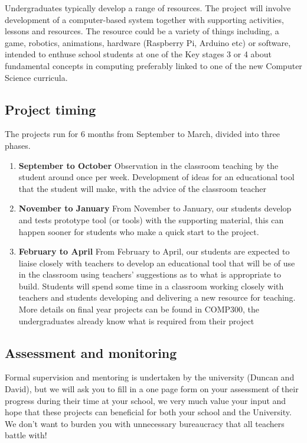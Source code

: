 \documentclass[12pt,]{book}
\providecommand{\tightlist}{%
  \setlength{\itemsep}{0pt}\setlength{\parskip}{0pt}}
\begin{document}
Undergraduates typically develop a range of resources. The project will involve development of a computer-based system together with supporting activities, lessons and resources. The resource could be a variety of things including, a game, robotics, animations, hardware (Raspberry Pi, Arduino etc) or software, intended to enthuse school students at one of the Key stages 3 or 4 about fundamental concepts in computing preferably linked to one of the new Computer Science curricula.

\hypertarget{project-timing}{%
\subsection{Project timing}\label{project-timing}}

The projects run for 6 months from September to March, divided into three phases.

\begin{enumerate}
\def\labelenumi{\arabic{enumi}.}
\tightlist
\item
  \textbf{September to October} Observation in the classroom teaching by the student around once per week. Development of ideas for an educational tool that the student will make, with the advice of the classroom teacher
\item
  \textbf{November to January} From November to January, our students develop and tests prototype tool (or tools) with the supporting material, this can happen sooner for students who make a quick start to the project.
\item
  \textbf{February to April} From February to April, our students are expected to liaise closely with teachers to develop an educational tool that will be of use in the classroom using teachers' suggestions as to what is appropriate to build. Students will spend some time in a classroom working closely with teachers and students developing and delivering a new resource for teaching. More details on final year projects can be found in COMP300, the undergraduates already know what is required from their project
\end{enumerate}

\hypertarget{assessment-and-monitoring}{%
\subsection{Assessment and monitoring}\label{assessment-and-monitoring}}

Formal supervision and mentoring is undertaken by the university (Duncan and David), but we will ask you to fill in a one page form on your assessment of their progress during their time at your school, we very much value your input and hope that these projects can beneficial for both your school and the University. We don't want to burden you with unnecessary bureaucracy that all teachers battle with!
\end{document}
